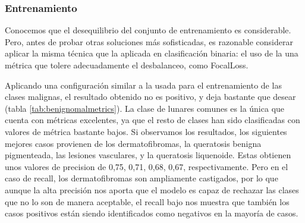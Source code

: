 \subsubsection{Entrenamiento}

Conocemos que el desequilibrio del conjunto de entrenamiento es considerable. Pero, antes de probar otras soluciones más sofisticadas, es razonable considerar aplicar la misma técnica que la aplicada en clasificación binaria: el uso de la una métrica que tolere adecuadamente el desbalanceo, como FocalLoss.

Aplicando una configuración similar a la usada para el entrenamiento de las clases malignas, el resultado obtenido no es positivo, y deja bastante que desear  (tabla \ref{tab:benignomalmetrics}). La clase de lunares comunes es la única que cuenta con métricas excelentes, ya que el resto de clases han sido clasificadas con valores de métrica bastante bajos. Si observamos los resultados,  los siguientes mejores casos provienen de los dermatofibromas, la queratosis benigna pigmenteada,  las lesiones vasculares, y la queratosis liquenoide. Estas obtienen unos valores de precision de 0,75, 0,71, 0,68, 0,67, respectivamente. Pero en el caso de recall, los dermatofibromas son ampliamente castigados, por lo que aunque la alta precisión nos aporta que el modelo es capaz de rechazar las clases que no lo son de manera aceptable, el recall bajo nos muestra que también los casos positivos están siendo identificados como negativos en la mayoría de casos.

